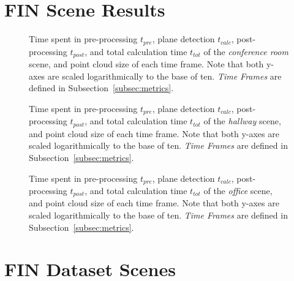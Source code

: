 \documentclass[main.tex]{subfiles}
\begin{document}
\appendix
\chapter{FIN Scene Results}
\label{app:fin}

\begin{figure}[H]
    \centering
    \def\svgwidth{0.7\textwidth}
    
    \caption[Time Results Conference Room Scene]{Time spent in pre-processing $t_{pre}$, plane detection $t_{calc}$, post-processing
        $t_{post}$, and total calculation time $t_{tot}$ of the \textit{conference room} scene, and point cloud size of each time frame.
        Note that both y-axes are scaled logarithmically to the base of ten. \textit{Time Frames} are defined in Subsection~\ref{subsec:metrics}.}
    \label{fig:dynconf}
\end{figure}

\begin{figure}[H]
    \centering
    \def\svgwidth{0.7\textwidth}
    
    \caption[Time Results Hallway Scene]{Time spent in pre-processing $t_{pre}$, plane detection $t_{calc}$, post-processing
        $t_{post}$, and total calculation time $t_{tot}$ of the \textit{hallway} scene, and point cloud size of each time frame.
        Note that both y-axes are scaled logarithmically to the base of ten. \textit{Time Frames} are defined in Subsection~\ref{subsec:metrics}.}
    \label{fig:dynhallway}
\end{figure}

\begin{figure}[p]
    \centering
    \def\svgwidth{0.7\textwidth}
    
    \caption[Time Results Office Scene]{Time spent in pre-processing $t_{pre}$, plane detection $t_{calc}$, post-processing
        $t_{post}$, and total calculation time $t_{tot}$ of the \textit{office} scene, and point cloud size of each time frame.
        Note that both y-axes are scaled logarithmically to the base of ten. \textit{Time Frames} are defined in Subsection~\ref{subsec:metrics}.}
    \label{fig:dynoff}
\end{figure}

\chapter{FIN Dataset Scenes}
\label{app:fin-scenes}
\end{document}

